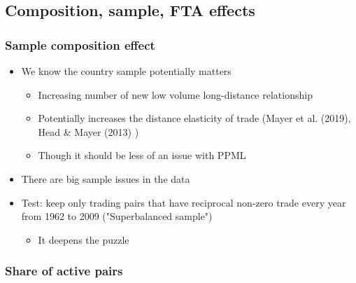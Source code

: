 \documentclass{beamer}
\begin{document}
\subsection{Composition, sample, FTA effects}
\begin{frame}\frametitle{Sample composition effect}
\begin{itemize}
\item We know the country sample potentially matters
	\begin{itemize}
	\item Increasing number of new low volume long-distance relationship
	\item Potentially increases the distance elasticity of trade (Mayer et al. (2019), Head \& Mayer (2013) ) 
	\item Though it should be less of an issue with PPML
	\end{itemize}
\item There are big sample issues in the data	
\item Test: keep only trading pairs that have reciprocal non-zero trade every year from 1962 to 2009 ("Superbalanced sample")
	\begin{itemize}
	\item It deepens the puzzle 
	\end{itemize}
\end{itemize}
\end{frame}



\begin{frame}[plain]\frametitle{Share of active pairs}
\begin{figure}[h!]
\begin{center}
\setlength{\fboxrule}{1pt} %
\setlength{\fboxsep}{.1in} %
\end{center}
\end{figure}
\end{frame}
\end{document}
